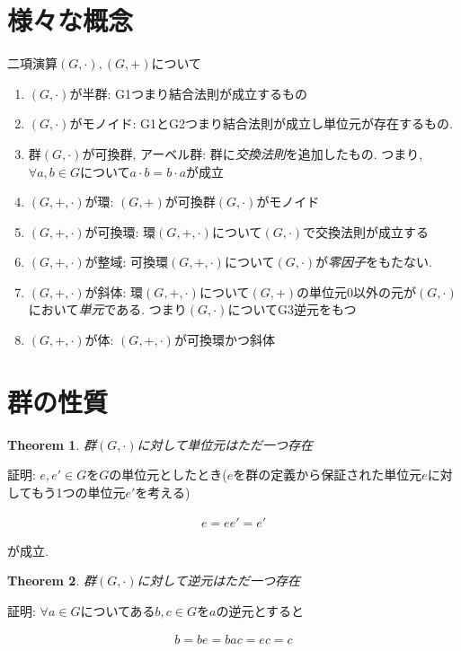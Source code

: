 \documentclass{article}
\theoremstyle{plain}
\newtheorem{theorem}{Theorem}
\theoremstyle{definition}
\theoremstyle{plain}
\numberwithin{equation}{section}
\numberwithin{theorem}{section}
\numberwithin{definition}{section}
\numberwithin{note}{section}
\begin{document}
\section{様々な概念}
二項演算$(G,\cdot),(G,+)$について
\begin{enumerate}
     \item $(G,\cdot)$が半群: G1つまり結合法則が成立するもの
     \item $(G,\cdot)$がモノイド: G1とG2つまり結合法則が成立し単位元が存在するもの.

     \item 群$(G,\cdot)$が可換群, アーベル群: 群に\emph{交換法則}を追加したもの. つまり, $\forall a,b\in G$について$a\cdot b=b\cdot a$が成立
     \item $(G,+,\cdot)$が環: $(G,+)$が可換群$(G,\cdot)$がモノイド
     \item $(G,+,\cdot)$が可換環: 環$(G,+,\cdot)$について$(G,\cdot)$で交換法則が成立する
     \item $(G,+,\cdot)$が整域: 可換環$(G,+,\cdot)$について$(G,\cdot)$が\emph{零因子}をもたない.
     \item $(G,+,\cdot)$が斜体: 環$(G,+,\cdot)$について$(G,+)$の単位元$0$以外の元が$(G,\cdot)$において\emph{単元}である. つまり$(G,\cdot)$についてG3逆元をもつ
     \item $(G,+,\cdot)$が体: $(G,+,\cdot)$が可換環かつ斜体
\end{enumerate}

\section{群の性質}
\begin{theorem}
     群$(G,\cdot)$に対して単位元はただ一つ存在
\end{theorem}

証明: $e,e'\in G$を$G$の単位元としたとき($e$を群の定義から保証された単位元$e$に対してもう1つの単位元$e'$を考える)

\begin{align}
     e=ee'=e'
\end{align}

が成立.
\begin{theorem}
     群$(G,\cdot)$に対して逆元はただ一つ存在
\end{theorem}


証明: $\forall a\in G$についてある$b,c\in G$を$a$の逆元とすると

\begin{align}
     b=be=bac=ec=c
\end{align}
\end{document}
